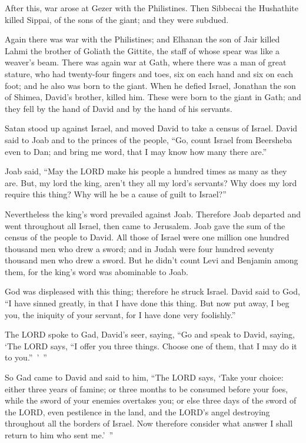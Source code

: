 \myverse{}After this, war arose at Gezer with the Philistines. Then Sibbecai
the Hushathite killed Sippai, of the sons of the giant; and they were subdued.

\myverse{}Again there was war with the Philistines; and Elhanan the son
of Jair killed Lahmi the brother of Goliath the Gittite, the staff of whose spear was like a weaver’s
beam.
\myverse{}There was again war at Gath, where there was a man of great stature, who had
twenty-four fingers and toes, six on each hand and six on each foot; and he also was born to the giant.
\myverse{}When he defied Israel, Jonathan the son of Shimea, David’s brother, killed
him.
\myverse{}These were born to the giant in Gath; and they fell by the hand of David and
by the hand of his servants.


\mychapter{} \myverse*{}Satan stood up against Israel, and moved David to take a census
of Israel.
\myverse{}David said to Joab and to the princes of the people, “Go, count Israel from
Beersheba even to Dan; and bring me word, that I may know how many there are.”

\myverse{}Joab said, “May the LORD make his people a hundred times as many
as they are. But, my lord the king, aren’t they all my lord’s servants? Why does my lord require this
thing? Why will he be a cause of guilt to Israel?”

\myverse{}Nevertheless the king’s word prevailed against Joab. Therefore
Joab departed and went throughout all Israel, then came to Jerusalem.
\myverse{}Joab gave the sum of the census of the people to David. All those of Israel
were one million one hundred thousand men who drew a sword; and in Judah were four hundred seventy thousand
men who drew a sword.
\myverse{}But he didn’t count Levi and Benjamin among them, for the king’s word was abominable
to Joab.

\myverse{}God was displeased with this thing; therefore he struck Israel.
\myverse{}David said to God, “I have sinned greatly, in that I have done this thing.
But now put away, I beg you, the iniquity of your servant, for I have done very foolishly.”

\myverse{}The LORD spoke to Gad, David’s seer, saying,
\myverse{}“Go and speak to David, saying, ‘The LORD says, “I offer you three things.
Choose one of them, that I may do it to you.” ’ ”

\myverse{}So Gad came to David and said to him, “The LORD says, ‘Take
your choice:
\myverse{}either three years of famine; or three months to be consumed before your
foes, while the sword of your enemies overtakes you; or else three days of the sword of the LORD, even
pestilence in the land, and the LORD’s angel destroying throughout all the borders of Israel. Now therefore
consider what answer I shall return to him who sent me.’ ”

